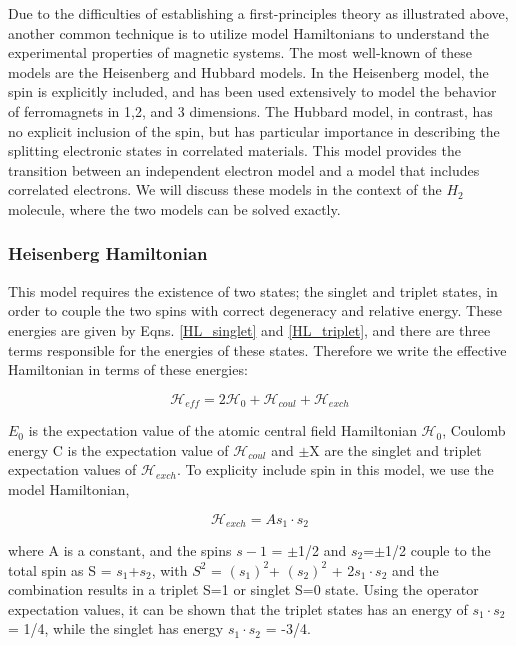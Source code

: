 Due to the difficulties of establishing a first-principles theory as illustrated above, another common technique is to utilize model Hamiltonians to understand the experimental properties of magnetic systems. The most well-known of these models are the Heisenberg and Hubbard models. In the Heisenberg model, the spin is explicitly included, and has been used extensively to model the behavior of ferromagnets in 1,2, and 3 dimensions. The Hubbard model, in contrast, has no explicit inclusion of the spin, but has particular importance in describing the splitting electronic states in correlated materials. This model provides the transition between an independent electron model and a model that includes correlated electrons. We will discuss these models in the context of the $H_2$ molecule, where the two models can be solved exactly. 

\subsubsection{Heisenberg Hamiltonian}

This model requires the existence of two states; the singlet and triplet states, in order to couple the two spins with correct degeneracy and relative energy. These energies are given by Eqns. \ref{HL_singlet} and \ref{HL_triplet}, and there are three terms responsible for the energies of these states. Therefore we write the effective Hamiltonian in terms of these energies:

\begin{equation}
\mathscr{H}_{eff}=2\mathscr{H}_0+\mathscr{H}_{coul}+\mathscr{H}_{exch}
\end{equation}

$E_0$ is the expectation value of the atomic central field Hamiltonian $\mathscr{H}_0$, Coulomb energy C is the expectation value of $\mathscr{H}_{coul}$ and $\pm$X are the singlet and triplet expectation values of $\mathscr{H}_{exch}$. To explicity include spin in this model, we use the model Hamiltonian,

\begin{equation}
\mathscr{H}_{exch}=A s_1 \cdot s_2
\end{equation}

where A is a constant, and the spins $s-1$ = $\pm$1/2 and $s_2$=$\pm$1/2 couple to the total spin as S = $s_1$+$s_2$, with $S^2$ = $(s_1)^2$+ $(s_2)^2$ + 2$s_1\cdot s_2$ and the combination results in a triplet S=1 or singlet S=0 state. Using the operator expectation values, it can be shown that the triplet states has an energy of $s_1 \cdot s_2$ = 1/4, while the singlet has energy $s_1 \cdot s_2$ = -3/4. 

